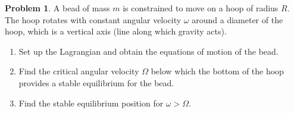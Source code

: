\documentclass[twoside,11pt]{article}
\newcommand{\lms}{\fontfamily{lmss}\selectfont} %
\theoremstyle{definition}
\newtheorem{problem}{\lms Problem}
\theoremstyle{remark}
\begin{document}
\begin{problem}
A bead of mass $m$ is constrained to move on a hoop of radius $R$.
The hoop rotates with constant angular velocity $\omega$ around a diameter of
the hoop, which is a vertical axis (line along which gravity acts).
\begin{enumerate}[label=\arabic*)]
\item Set up the Lagrangian and obtain the equations of motion of the bead.

\item Find the critical angular velocity $\Omega$ below which the bottom of the
hoop provides a stable equilibrium for the bead.

\item Find the stable equilibrium position for $\omega > \Omega$.
\end{enumerate}
\end{problem}
\end{document}

